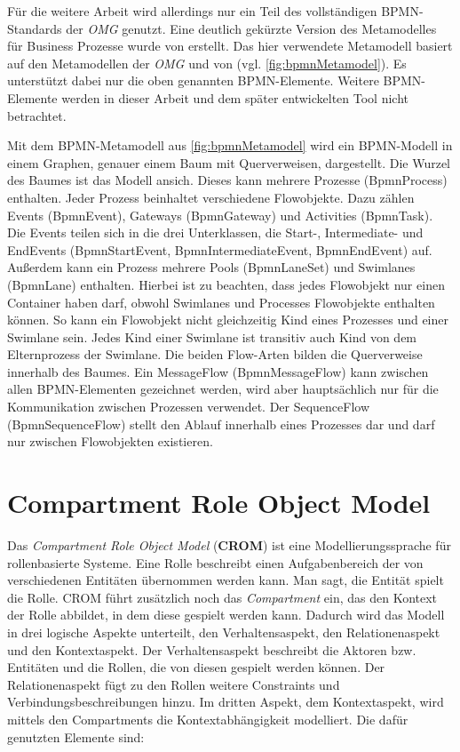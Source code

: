 Für die weitere Arbeit wird allerdings nur ein Teil des vollständigen BPMN-Standards der \emph{OMG} genutzt.
Eine deutlich gekürzte Version des Metamodelles für Business Prozesse wurde von \cite{Loja2010} erstellt.
Das hier verwendete Metamodell basiert auf den Metamodellen der \emph{OMG} und von \cite{Loja2010} (vgl. \cref{fig:bpmnMetamodel}).
Es unterstützt dabei nur die oben genannten BPMN-Elemente.
Weitere BPMN-Elemente werden in dieser Arbeit und dem später entwickelten Tool nicht betrachtet.

Mit dem BPMN-Metamodell aus \cref{fig:bpmnMetamodel} wird ein BPMN-Modell in einem Graphen, genauer einem Baum mit Querverweisen, dargestellt.
Die Wurzel des Baumes ist das Modell ansich.
Dieses kann mehrere Prozesse (BpmnProcess) enthalten.
Jeder Prozess beinhaltet verschiedene Flowobjekte. 
Dazu zählen Events (BpmnEvent), Gateways (BpmnGateway) und Activities (BpmnTask).
Die Events teilen sich in die drei Unterklassen, die Start-, Intermediate- und EndEvents (BpmnStartEvent, BpmnIntermediateEvent, BpmnEndEvent) auf.
Außerdem kann ein Prozess mehrere Pools (BpmnLaneSet) und Swimlanes (BpmnLane) enthalten.
Hierbei ist zu beachten, dass jedes Flowobjekt nur einen Container haben darf, obwohl Swimlanes und Processes Flowobjekte enthalten können.
So kann ein Flowobjekt nicht gleichzeitig Kind eines Prozesses und einer Swimlane sein.
Jedes Kind einer Swimlane ist transitiv auch Kind von dem Elternprozess der Swimlane.
Die beiden Flow-Arten bilden die Querverweise innerhalb des Baumes.
Ein MessageFlow (BpmnMessageFlow) kann zwischen allen BPMN-Elementen gezeichnet werden, wird aber hauptsächlich nur für die Kommunikation zwischen Prozessen verwendet.
Der SequenceFlow (BpmnSequenceFlow) stellt den Ablauf innerhalb eines Prozesses dar und darf nur zwischen Flowobjekten existieren.

\section{Compartment Role Object Model}

Das \emph{Compartment Role Object Model} (\textbf{CROM}) ist eine Modellierungssprache für rollenbasierte Systeme.
Eine Rolle beschreibt einen Aufgabenbereich der von verschiedenen Entitäten übernommen werden kann.
Man sagt, die Entität spielt die Rolle.
CROM führt zusätzlich noch das \emph{Compartment} ein, das den Kontext der Rolle abbildet, in dem diese gespielt werden kann.
Dadurch wird das Modell in drei logische Aspekte unterteilt, den Verhaltensaspekt, den Relationenaspekt und den Kontextaspekt.
Der Verhaltensaspekt beschreibt die Aktoren bzw. Entitäten und die Rollen, die von diesen gespielt werden können.
Der Relationenaspekt fügt zu den Rollen weitere Constraints und Verbindungsbeschreibungen hinzu.
Im dritten Aspekt, dem Kontextaspekt, wird mittels den Compartments die Kontextabhängigkeit modelliert.
Die dafür genutzten Elemente sind:

